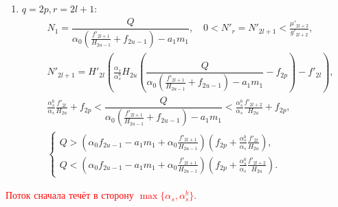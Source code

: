 \begin{enumerate}
    \item \(q=2p, r=2l+1\):
    \begin{align*}
        & N_1 = \dfrac{Q}{ \alpha_0 \left( \frac{f'_{2l+1}}{H_{2u-1}} + f_{2u-1} \right) - a_1 m_1 }, \quad 0 < N'_r = N'_{2l+1} < \frac{\mu'_{2l+2}}{g'_{2l+2}}, \\
        & N'_{2l+1} = H'_{2l} \left( \frac{\alpha_s}{\alpha^b_s} H_{2u} \left( \dfrac{Q}{ \alpha_0 \left( \frac{f'_{2l+1}}{H_{2u-1}} + f_{2u-1} \right) - a_1 m_1 } - f_{2p} \right) - f'_{2l} \right), \\
        & \frac{\alpha^b_s}{\alpha_s} \frac{f'_{2l}}{H_{2u}} + f_{2p} < \dfrac{Q}{ \alpha_0 \left( \frac{f'_{2l+1}}{H_{2u-1}} + f_{2u-1} \right) - a_1 m_1 } < \frac{\alpha^b_s}{\alpha_s} \frac{f'_{2l+2}}{H_{2u}} + f_{2p}, \\ 
        & \begin{cases}
            Q > \left( \alpha_0 f_{2u-1} - a_1 m_1  + \alpha_0 \frac{f'_{2l+1}}{H_{2u-1}}\right) \left( f_{2p} + \frac{\alpha^b_s}{\alpha_s} \frac{f'_{2l}}{H_{2u}} \right), \\
            Q < \left( \alpha_0 f_{2u-1} - a_1 m_1  + \alpha_0 \frac{f'_{2l+1}}{H_{2u-1}}\right) \left( f_{2p} + \frac{\alpha^b_s}{\alpha_s} \frac{f'_{2l+2}}{H_{2u}} \right).
        \end{cases}
    \end{align*}
\end{enumerate}


\textcolor{red}{Поток сначала течёт в сторону \(\max \{ \alpha_s, \alpha^b_s \}\).}